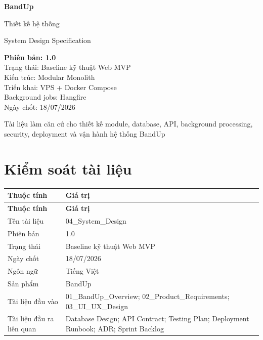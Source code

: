 \documentclass[11pt,a4paper]{article}
\begin{document}
\begin{titlepage}
\centering
\vspace*{2.3cm}
{\sffamily\fontsize{34}{40}\selectfont\bfseries\color{BandBlue} BandUp\par}
\vspace{0.55cm}
{\sffamily\fontsize{22}{28}\selectfont Thiết kế hệ thống\par}
\vspace{0.25cm}
{\sffamily\large System Design Specification\par}
\vfill
\begin{tcolorbox}[colback=BandLight,colframe=BandBlue,width=0.82\textwidth,boxrule=0.7pt,arc=2mm]
\centering\sffamily
\textbf{Phiên bản: 1.0}\\[1mm]
Trạng thái: Baseline kỹ thuật Web MVP\\[1mm]
Kiến trúc: Modular Monolith\\[1mm]
Triển khai: VPS + Docker Compose\\[1mm]
Background jobs: Hangfire\\[1mm]
Ngày chốt: 18/07/2026
\end{tcolorbox}
\vspace{1.1cm}
{\sffamily\small Tài liệu làm căn cứ cho thiết kế module, database, API, background processing, security, deployment và vận hành hệ thống BandUp\par}
\vspace*{1cm}
\end{titlepage}

\section*{Kiểm soát tài liệu}
\small
\setlength{\tabcolsep}{4pt}
\renewcommand{\arraystretch}{1.18}
\begin{longtable}{|P{0.28\textwidth}|P{0.64\textwidth}|}
\hline
\textbf{Thuộc tính} & \textbf{Giá trị} \\ \hline
\endfirsthead
\hline
\textbf{Thuộc tính} & \textbf{Giá trị} \\ \hline
\endhead
Tên tài liệu & 04\_System\_Design \\ \hline
Phiên bản & 1.0 \\ \hline
Trạng thái & Baseline kỹ thuật Web MVP \\ \hline
Ngày chốt & 18/07/2026 \\ \hline
Ngôn ngữ & Tiếng Việt \\ \hline
Sản phẩm & BandUp \\ \hline
Tài liệu đầu vào & 01\_BandUp\_Overview; 02\_Product\_Requirements; 03\_UI\_UX\_Design \\ \hline
Tài liệu đầu ra liên quan & Database Design; API Contract; Testing Plan; Deployment Runbook; ADR; Sprint Backlog \\ \hline
\end{longtable}
\normalsize
\end{document}
